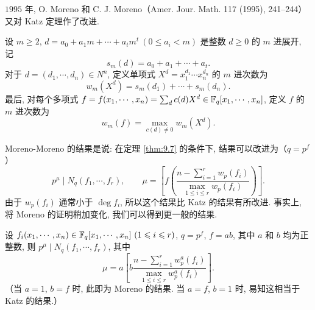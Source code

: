 $1995$ 年, O. Moreno 和 C. J. Moreno（Amer. Jour. Math. 117 (1995), 241--244）又对 Katz 定理作了改进.

\begin{definition}\label{def:ch9-1}
设 $m\geqslant 2$, $d=a_0+a_1m+\cdots+a_tm^t\ (0\leqslant a_i<m)$ 是整数 $d\geqslant 0$ 的 $m$ 进展开, 记
\[
  s_m(d)=a_0+a_1+\cdots+a_t.
\]
对于 $d=(d_1,\cdots,d_n)\in N^n$, 定义单项式 $X^d=x_1^{d_1}\cdots x_n^{d_n}$ 的 $m$ 进次数为
\[
  w_m(X^d)=s_m(d_1)+\cdots+s_m(d_n).
\]
最后, 对每个多项式 $f=f(x_1,\cdots,x_n)=\sum_dc(d)X^d\in\mathbb{F}_q[x_1,\cdots,x_n]$, 定义 $f$ 的 $m$ 进次数为
\[
  w_m(f)=\max_{c(d)\neq 0}w_m(X^d).
\]
\end{definition}

Moreno-Moreno 的结果是说: 在定理 \ref{thm:9.7} 的条件下, 结果可以改进为（$q=p^f$）
\[
  p^{\mu}\mid N_q(f_1,\cdots,f_r),\qquad
  \mu=\left[f\left(\frac{n-\sum_{i=1}^{r}w_p(f_i)}
  {\max\limits_{1\leqslant i\leqslant r}w_p(f_i)}\right)\right].
\]
由于 $w_p(f_i)$ 通常小于 $\deg f_i$, 所以这个结果比 Katz 的结果有所改进. 事实上, 将 Moreno 的证明稍加变化, 我们可以得到更一般的结果.

\begin{theorem}\label{thm:9.8}
设 $f_i(x_1,\cdots,x_n)\in\F_q[x_1,\cdots,x_n]\ (1\leqslant i\leqslant r)$, $q=p^f$, $f=ab$, 其中 $a$ 和 $b$ 均为正整数, 则 $p^{\mu}\mid N_q(f_1,\cdots,f_r)$, 其中
\[
  \mu=a\left[b\frac{n-\sum_{i=1}^{r}w_p^a(f_i)}
  {\max\limits_{1\leqslant i\leqslant r}w_p^a(f_i)}\right].
\]
（当 $a=1$, $b=f$ 时, 此即为 Moreno 的结果. 当 $a=f$, $b=1$ 时, 易知这相当于 Katz 的结果.）
\end{theorem}

